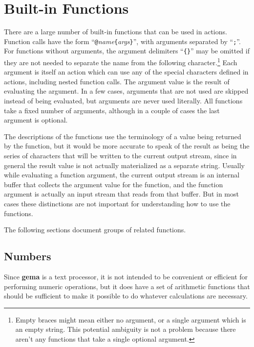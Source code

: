 
\section{Built-in Functions}
There are a large number of built-in functions that can be used in
actions.
Function calls have the form
``\verb|@|{\it name}\verb|{|{\it args}\verb|}|'', with arguments separated by
``\verb|;|''.
For functions
without arguments, the argument delimiters
``\verb|{}|''
may be omitted if they are not needed to separate the name from the following
character.\footnote{Empty braces might mean either no argument, or a
single argument which is an empty string.  This potential ambiguity is
not a problem because there aren't any functions that take a single
optional argument.}
Each argument is itself an action which can use any of the special
characters defined in actions, including nested function calls.
The argument value is the result of evaluating the argument.
In a few cases, arguments that are not used are skipped instead of
being evaluated, but arguments are never used literally.
All functions take a fixed number of arguments, although in a couple of cases
the last argument is optional.

The descriptions of the functions use the terminology of a value being
returned by the function, but it would be more accurate to speak of the
result as being the series of characters that will be written to the
current output stream, since in general the result value is not actually
materialized as a separate string.  Usually while evaluating a function
argument, the current output stream is an internal buffer that collects the
argument value for the function, and the function argument is actually an
input stream that reads from that buffer.  But in most cases these
distinctions are not important for understanding how to use the functions.

The following sections document groups of related functions.

\subsection{Numbers}
Since {\bf gema} is a text processor, it is not intended to be
convenient or efficient for performing numeric operations, but it does
have a set of arithmetic functions that should be sufficient to make it
possible to do whatever calculations are necessary.

